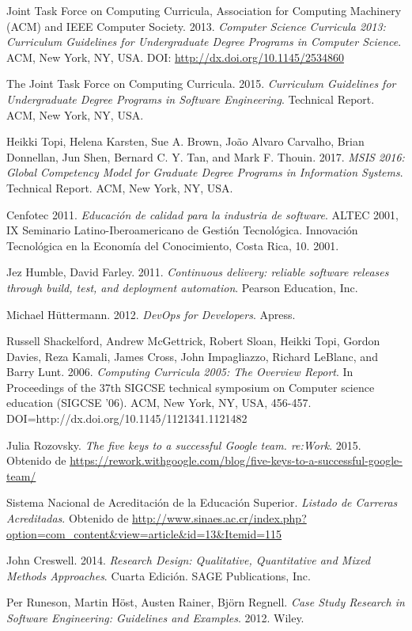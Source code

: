 \begin{thebibliography}{99}
Joint Task Force on Computing Curricula, Association for Computing Machinery (ACM) and IEEE Computer Society. 2013. \emph{Computer Science Curricula 2013: Curriculum Guidelines for Undergraduate Degree Programs in Computer Science}. ACM, New York, NY, USA. DOI: \url{http://dx.doi.org/10.1145/2534860}

The Joint Task Force on Computing Curricula. 2015. \emph{Curriculum Guidelines for Undergraduate Degree Programs in Software Engineering}. Technical Report. ACM, New York, NY, USA. 

Heikki Topi, Helena Karsten, Sue A. Brown, João Alvaro Carvalho, Brian Donnellan, Jun Shen, Bernard C. Y. Tan, and Mark F. Thouin. 2017. \emph{MSIS 2016: Global Competency Model for Graduate Degree Programs in Information Systems}. Technical Report. ACM, New York, NY, USA.

Cenfotec 2011. \emph{Educación de calidad para la industria de software}. ALTEC 2001, IX Seminario Latino-Iberoamericano de Gestión Tecnológica. Innovación Tecnológica en la Economía del Conocimiento, Costa Rica, 10. 2001.

Jez Humble, David Farley. 2011. \emph{Continuous delivery: reliable software releases through build, test, and deployment automation}. Pearson Education, Inc.

Michael Hüttermann. 2012. \emph{DevOps for Developers}. Apress.

Russell Shackelford, Andrew McGettrick, Robert Sloan, Heikki Topi, Gordon Davies, Reza Kamali, James Cross, John Impagliazzo, Richard LeBlanc, and Barry Lunt. 2006. \emph{Computing Curricula 2005: The Overview Report}. In Proceedings of the 37th SIGCSE technical symposium on Computer science education (SIGCSE '06). ACM, New York, NY, USA, 456-457. DOI=http://dx.doi.org/10.1145/1121341.1121482  

Julia Rozovsky. \emph{The five keys to a successful Google team. re:Work}. 2015. Obtenido de  \url{https://rework.withgoogle.com/blog/five-keys-to-a-successful-google-team/}

Sistema Nacional de Acreditación de la Educación Superior. \emph{Listado de Carreras Acreditadas}. Obtenido de \url{http://www.sinaes.ac.cr/index.php?option=com_content\&view=article&id=13\&Itemid=115}

John Creswell. 2014. \emph{Research Design: Qualitative, Quantitative and Mixed Methods Approaches}. Cuarta Edición. SAGE Publications, Inc.

Per Runeson, Martin Höst, Austen Rainer, Björn Regnell. \emph{Case Study Research in Software Engineering: Guidelines and Examples}. 2012. Wiley. 

\end{thebibliography}


